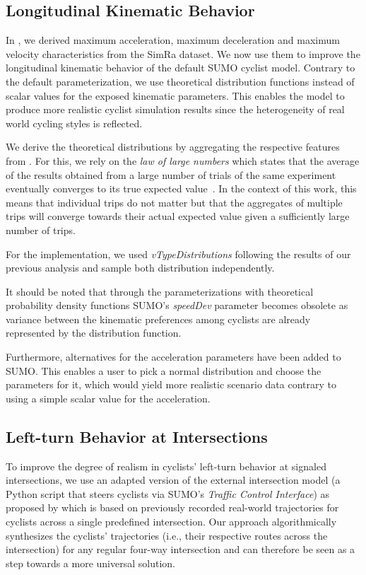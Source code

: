 \subsection{Longitudinal Kinematic Behavior}
\label{subsec:longitudinal_kinematic_behavior}
In , we derived maximum acceleration, maximum deceleration and maximum velocity characteristics from the SimRa dataset.
We now use them to improve the longitudinal kinematic behavior of the default SUMO cyclist model.
Contrary to the default parameterization, we use theoretical distribution functions instead of scalar values for the exposed kinematic parameters.
This enables the model to produce more realistic cyclist simulation results since the heterogeneity of real world cycling styles is reflected.

We derive the theoretical distributions by aggregating the respective features from .
For this, we rely on the \textit{law of large numbers} which states that the average of the results obtained from a large number of trials of the same experiment eventually converges to its true expected value~\cite{etemadi1981elementary}.
In the context of this work, this means that individual trips do not matter but that the aggregates of multiple trips will converge towards their actual expected value given a sufficiently large number of trips.

For the implementation, we used \textit{vTypeDistributions} following the results of our previous analysis and sample both distribution independently.

It should be noted that through the parameterizations with theoretical probability density functions SUMO's \textit{speedDev} parameter becomes obsolete as variance between the kinematic preferences among cyclists are already represented by the distribution function.

Furthermore, alternatives for the acceleration parameters have been added to SUMO.
This enables a user to pick a normal distribution and choose the parameters for it, which would yield more realistic scenario data contrary to using a simple scalar value for the acceleration.

\subsection{Left-turn Behavior at Intersections}
\label{subsec:left-turn_behavior_at_intersections}
To improve the degree of realism in cyclists' left-turn behavior at signaled intersections, we use an adapted version of the external intersection model (a Python script that steers cyclists via SUMO's \textit{Traffic Control Interface}) as proposed by \textcite{kaths2016integration} which is based on previously recorded real-world trajectories for cyclists across a single predefined intersection.
Our approach algorithmically synthesizes the cyclists' trajectories (i.e., their respective routes across the intersection) for any regular four-way intersection and can therefore be seen as a step towards a more universal solution.

